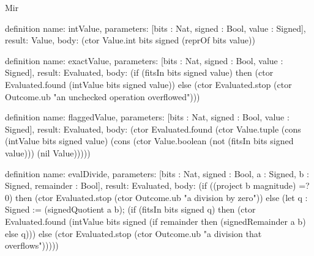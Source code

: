 \begin{lexlean}{Mir}
\begin{semanticmodule}
definition{
  name: intValue,
  parameters: [bits : Nat, signed : Bool, value : Signed],
  result: Value,
  body: (ctor Value.int bits signed (reprOf bits value))
}

definition{
  name: exactValue,
  parameters: [bits : Nat, signed : Bool, value : Signed],
  result: Evaluated,
  body: (if (fitsIn bits signed value) then (ctor Evaluated.found (intValue bits signed value)) else (ctor Evaluated.stop (ctor Outcome.ub "an unchecked operation overflowed")))
}

definition{
  name: flaggedValue,
  parameters: [bits : Nat, signed : Bool, value : Signed],
  result: Evaluated,
  body: (ctor Evaluated.found (ctor Value.tuple (cons (intValue bits signed value) (cons (ctor Value.boolean (not (fitsIn bits signed value))) (nil Value)))))
}

definition{
  name: evalDivide,
  parameters: [bits : Nat, signed : Bool, a : Signed, b : Signed, remainder : Bool],
  result: Evaluated,
  body: (if ((project b magnitude) =? 0) then (ctor Evaluated.stop (ctor Outcome.ub "a division by zero")) else (let q : Signed := (signedQuotient a b); (if (fitsIn bits signed q) then (ctor Evaluated.found (intValue bits signed (if remainder then (signedRemainder a b) else q))) else (ctor Evaluated.stop (ctor Outcome.ub "a division that overflows")))))
}


\end{semanticmodule}
\end{lexlean}
